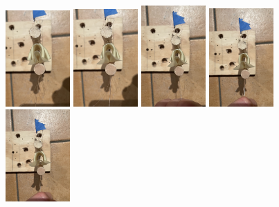 \documentclass[11pt]{report}
\begin{document}
\begin{figure}[h]
\centering
  \includegraphics[width=0.22\textwidth]{images/46.JPG}
  \includegraphics[width=0.22\textwidth]{images/47.JPG}
  \includegraphics[width=0.22\textwidth]{images/48.JPG}
  \includegraphics[width=0.22\textwidth]{images/49.JPG}
  \includegraphics[width=0.22\textwidth]{images/50.JPG}

\end{figure}
\end{document}

